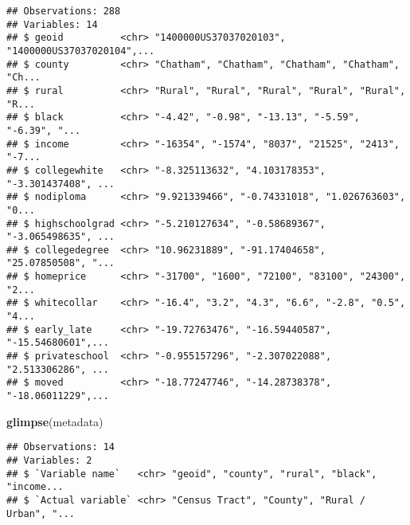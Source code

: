 \documentclass[]{article}
\newenvironment{Shaded}{\begin{snugshade}}{\end{snugshade}}
\newcommand{\KeywordTok}[1]{\textcolor[rgb]{0.13,0.29,0.53}{\textbf{#1}}}
\newcommand{\NormalTok}[1]{#1}
\begin{document}
\begin{verbatim}
## Observations: 288
## Variables: 14
## $ geoid          <chr> "1400000US37037020103", "1400000US37037020104",...
## $ county         <chr> "Chatham", "Chatham", "Chatham", "Chatham", "Ch...
## $ rural          <chr> "Rural", "Rural", "Rural", "Rural", "Rural", "R...
## $ black          <chr> "-4.42", "-0.98", "-13.13", "-5.59", "-6.39", "...
## $ income         <chr> "-16354", "-1574", "8037", "21525", "2413", "-7...
## $ collegewhite   <chr> "-8.325113632", "4.103178353", "-3.301437408", ...
## $ nodiploma      <chr> "9.921339466", "-0.74331018", "1.026763603", "0...
## $ highschoolgrad <chr> "-5.210127634", "-0.58689367", "-3.065498635", ...
## $ collegedegree  <chr> "10.96231889", "-91.17404658", "25.07850508", "...
## $ homeprice      <chr> "-31700", "1600", "72100", "83100", "24300", "2...
## $ whitecollar    <chr> "-16.4", "3.2", "4.3", "6.6", "-2.8", "0.5", "4...
## $ early_late     <chr> "-19.72763476", "-16.59440587", "-15.54680601",...
## $ privateschool  <chr> "-0.955157296", "-2.307022088", "2.513306286", ...
## $ moved          <chr> "-18.77247746", "-14.28738378", "-18.06011229",...
\end{verbatim}

\begin{Shaded}
\begin{Highlighting}[]
\KeywordTok{glimpse}\NormalTok{(metadata)}
\end{Highlighting}
\end{Shaded}

\begin{verbatim}
## Observations: 14
## Variables: 2
## $ `Variable name`   <chr> "geoid", "county", "rural", "black", "income...
## $ `Actual variable` <chr> "Census Tract", "County", "Rural / Urban", "...
\end{verbatim}
\end{document}
